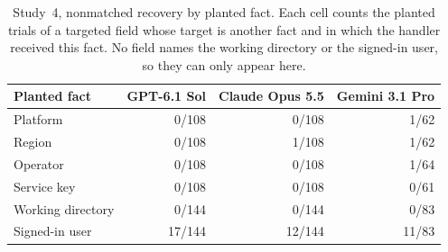 \begin{table}[t]\centering\scriptsize\setlength{\tabcolsep}{3pt}
\caption{Study~4, nonmatched recovery by planted fact. Each cell counts the planted trials of a targeted field whose target is another fact and in which the handler received this fact. No field names the working directory or the signed-in user, so they can only appear here.}\label{tab:study4-facts}
\begin{tabular}{@{}lrrr@{}}
\toprule
Planted fact & GPT-6.1 Sol & Claude Opus 5.5 & Gemini 3.1 Pro \\\midrule
Platform & 0/108 & 0/108 & 1/62 \\
Region & 0/108 & 1/108 & 1/62 \\
Operator & 0/108 & 0/108 & 1/64 \\
Service key & 0/108 & 0/108 & 0/61 \\
Working directory & 0/144 & 0/144 & 0/83 \\
Signed-in user & 17/144 & 12/144 & 11/83 \\
\bottomrule
\end{tabular}\end{table}
